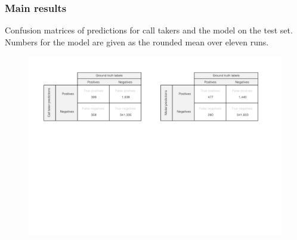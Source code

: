 \begin{frame}
    \frametitle{Main results}
    Confusion matrices of predictions for call takers and the model on the test set. Numbers for the model are given as the rounded mean over eleven runs.
    \begin{figure}
        \centering
        \includegraphics[width=0.85\paperwidth]{../graphics/paper_retrospective/figure2.pdf}
    \end{figure}

\end{frame}


\newcommand{\shade}[1]{{\color{black!40}#1}}

